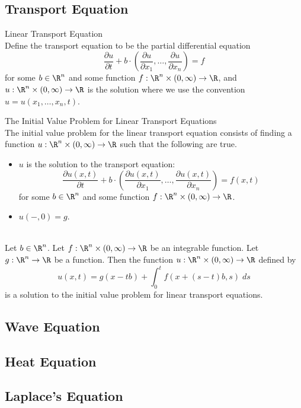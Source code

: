\documentclass[a4paper]{article}
\begin{document}
\subsection{Transport Equation}
\begin{defn}{Linear Transport Equation}{}\\
Define the transport equation to be the partial differential equation $$\frac{\partial u}{\partial t}+b\cdot\left(\frac{\partial u}{\partial x_1},\dots,\frac{\partial u}{\partial x_n}\right)=f$$ for some $b\in\R^n$ and some function $f:\R^n\times(0,\infty)\to\R$, and $u:\R^n\times(0,\infty)\to\R$ is the solution where we use the convention $u=u(x_1,\dots,x_n,t)$. 
\end{defn}

\begin{defn}{The Initial Value Problem for Linear Transport Equations}{}\\
The initial value problem for the linear transport equation consists of finding a function $u:\R^n\times(0,\infty)\to\R$ such that the following are true. 
\begin{itemize}
\item $u$ is the solution to the transport equation: $$\frac{\partial u(x,t)}{\partial t}+b\cdot\left(\frac{\partial u(x,t)}{\partial x_1},\dots,\frac{\partial u(x,t)}{\partial x_n}\right)=f(x,t)$$ for some $b\in\R^n$ and some function $f:\R^n\times(0,\infty)\to\R$. 
\item $u(-,0)=g$. 
\end{itemize}
\end{defn}

\begin{prp}{}{}\\
Let $b\in\R^n$. Let $f:\R^n\times(0,\infty)\to\R$ be an integrable function. Let $g:\R^n\to\R$ be a function. Then the function $u:\R^n\times(0,\infty)\to\R$ defined by $$u(x,t)=g(x-tb)+\int_0^tf(x+(s-t)b,s)\;ds$$ is a solution to the initial value problem for linear transport equations. 
\end{prp}

\subsection{Wave Equation}

\subsection{Heat Equation}

\subsection{Laplace's Equation}
\end{document}

